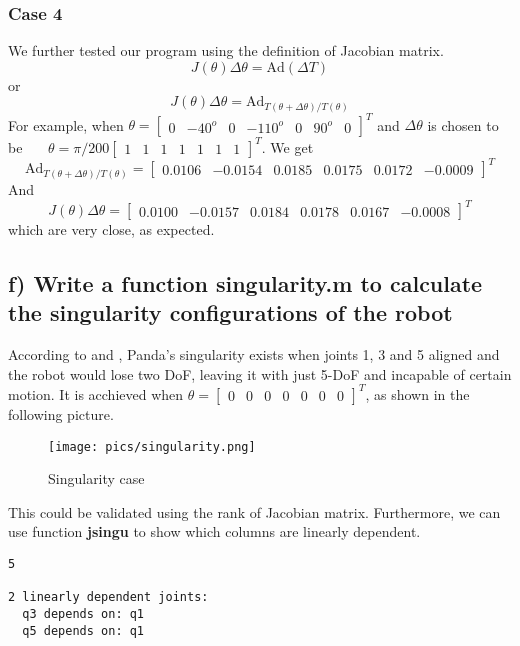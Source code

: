\documentclass[english,10pt,a4paper]{book}
\begin{document}
    \subsubsection*{Case 4}
    We further tested our program using the definition of Jacobian matrix.
    \begin{equation}
        J(\theta)\Delta \theta = \text{Ad}(\Delta T)
    \end{equation}
    or
    \begin{equation}
        J(\theta)\Delta \theta = \text{Ad}_{T(\theta + \Delta \theta) / T(\theta)}
    \end{equation}
    For example, when $\theta = \begin{bmatrix}
        0 & -40^o & 0 & -110^o & 0 & 90^o & 0
    \end{bmatrix}^T$ and $\Delta\theta$ is chosen to be \ \ \ $\theta = \pi/200\begin{bmatrix}
        1 & 1 & 1 & 1 & 1 & 1 & 1
    \end{bmatrix}^T$. We get
    \begin{equation}
        \text{Ad}_{T(\theta + \Delta \theta) / T(\theta)} = \begin{bmatrix}
                0.0106 &   -0.0154 &   0.0185 &   0.0175 &   0.0172 &  -0.0009
        \end{bmatrix}^T
    \end{equation}
    And 
    \begin{equation}
        J(\theta)\Delta \theta = \begin{bmatrix}
                0.0100 &   -0.0157 &   0.0184 &   0.0178 &   0.0167 &  -0.0008
        \end{bmatrix}^T
    \end{equation}
    which are very close, as expected.
    \subsection*{f) Write a function \textbf{singularity.m} to calculate the singularity configurations of the robot}
    According to \cite{Hepanda} and \cite{Tittelpanda}, Panda's singularity exists when joints 1, 3 and 5 aligned and the robot would lose two DoF, leaving it with just 5-DoF and incapable of certain motion. It is acchieved when $\theta = \begin{bmatrix}
        0 & 0 & 0 & 0 & 0 & 0 & 0
    \end{bmatrix}^T$, as shown in the following picture. 
    \begin{figure}[H]
        \centering
        \texttt{[image: pics/singularity.png]}
        \caption{Singularity case}
        \label{fig:enter-label}
    \end{figure}
    This could be validated using the rank of Jacobian matrix. Furthermore, we can use function \textbf{jsingu} to show which columns are linearly dependent.
    \begin{lstlisting}[style=matlab]
         5

2 linearly dependent joints:
  q3 depends on: q1 
  q5 depends on: q1 
    \end{lstlisting}
\end{document}
